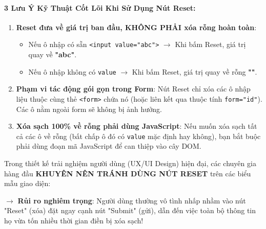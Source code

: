 \documentclass[11pt,oneside]{book}
\newcommand{\codeinline}[1]{\textcolor{accentOrange}{\texttt{#1}}}
\begin{document}
\paragraph{3 Lưu Ý Kỹ Thuật Cốt Lõi Khi Sử Dụng Nút Reset:}

\begin{warnBox}
\begin{enumerate}[leftmargin=1.5em, itemsep=3pt, parsep=0pt]
    \item \textbf{Reset đưa về giá trị ban đầu, KHÔNG PHẢI xóa rỗng hoàn toàn}:
    \begin{itemize}[leftmargin=1.2em, itemsep=1pt]
        \item Nếu ô nhập có sẵn \codeinline{<input value="abc">} $\rightarrow$ Khi bấm Reset, giá trị quay về \textbf{"abc"}.
        \item Nếu ô nhập không có \codeinline{value} $\rightarrow$ Khi bấm Reset, giá trị quay về rỗng \textbf{""}.
    \end{itemize}
    \item \textbf{Phạm vi tác động gói gọn trong Form}: Nút Reset chỉ xóa các ô nhập liệu thuộc cùng thẻ \codeinline{<form>} chứa nó (hoặc liên kết qua thuộc tính \codeinline{form="id"}). Các ô nằm ngoài form sẽ không bị ảnh hưởng.
    \item \textbf{Xóa sạch 100\% về rỗng phải dùng JavaScript}: Nếu muốn xóa sạch tất cả các ô về rỗng (bất chấp ô đó có \codeinline{value} mặc định hay không), bạn bắt buộc phải dùng đoạn mã JavaScript để can thiệp vào cây DOM.
\end{enumerate}
\end{warnBox}

\begin{warnBox}
Trong thiết kế trải nghiệm người dùng (UX/UI Design) hiện đại, các chuyên gia hàng đầu \textbf{KHUYÊN NÊN TRÁNH DÙNG NÚT RESET} trên các biểu mẫu giao diện:
\par\vspace{3pt}
$\rightarrow$ \textbf{Rủi ro nghiêm trọng}: Người dùng thường vô tình nhấp nhầm vào nút "Reset" (xóa) đặt ngay cạnh nút "Submit" (gửi), dẫn đến việc toàn bộ thông tin họ vừa tốn nhiều thời gian điền bị xóa sạch!
\end{warnBox}

\end{document}
